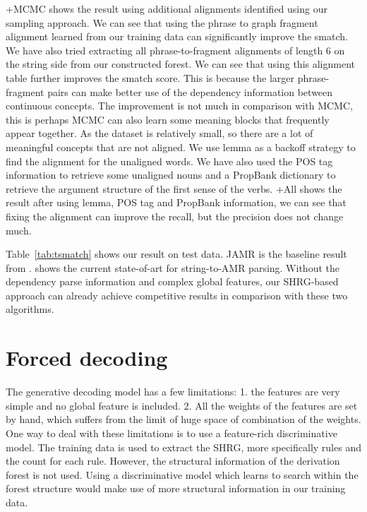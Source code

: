 +MCMC shows the result using additional alignments identified using our sampling approach. We can see that
using the phrase to graph fragment alignment learned from our training data can significantly improve the smatch.
We have also tried extracting all phrase-to-fragment alignments of length 6 on the string side 
from our constructed forest. We can see that using this alignment table further improves the smatch score.
This is because the larger phrase-fragment pairs can make better use of the dependency information
between continuous concepts. The improvement is not much in comparison with MCMC, this is perhaps 
MCMC can also learn some meaning blocks that frequently appear together.
As the dataset is relatively small, so there are a lot of meaningful concepts that are not aligned. We use lemma as a backoff strategy to find
the alignment for the unaligned words. We have also used the POS tag information to retrieve some unaligned nouns and a PropBank dictionary to 
retrieve the argument structure of the first sense of the verbs. +All
shows the result after using lemma, POS tag and PropBank information, we can see that fixing the alignment can improve the recall, but the precision does not change much. 
\begin{table}
\centering
{}
\caption{Comparisons of smatch score results}
\label{tab:tsmatch}
\end{table}

Table~\ref{tab:tsmatch} shows our result on test data. JAMR is the baseline result from .  shows the current state-of-art for string-to-AMR parsing.
Without the dependency parse information and complex global features, our SHRG-based approach can already achieve competitive results in comparison with these two algorithms.

\section{Forced decoding}
The generative decoding model has a few limitations: 1. the features are very simple and no global feature is included. 2. All the weights of the features are
set by hand, which suffers from the limit of huge space of combination of the weights.
One way to deal with these limitations is to use a feature-rich discriminative model. The training data is used to extract the SHRG, more specifically
rules and the count for each rule. However, the structural information of the derivation forest is not used. Using a discriminative model which
learns to search within the forest structure would make use of more structural information in our training data.


